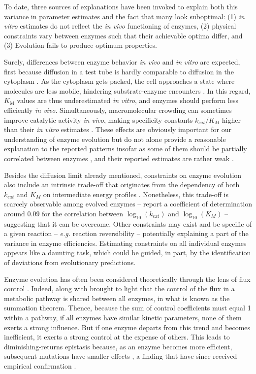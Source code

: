 \documentclass[11pt,onecolumn]{article}
\begin{document}
To date, three sources of explanations have been invoked to explain both this variance in parameter estimates and the fact that many look suboptimal: (1) \textit{in vitro} estimates do not reflect the \textit{in vivo} functioning of enzymes, (2) physical constraints vary between enzymes such that their achievable optima differ, and (3) Evolution fails to produce optimum properties.

Surely, differences between enzyme behavior \textit{in vivo} and \textit{in vitro} are expected, first because diffusion in a test tube is hardly comparable to diffusion in the cytoplasm \citep{Ellis01,Rivas04,Zhou08,Rivas18}. As the cytoplasm gets packed, the cell approaches a state where molecules are less mobile, hindering substrate-enzyme encounters \citep{Muramatsu88,Zimmerman93,Blanco18}. In this regard, $K_\text{M}$ values are thus underestimated \textit{in vitro}, and enzymes should perform less efficiently \textit{in vivo}. Simultaneously, macromolecular crowding can sometimes improve catalytic activity \textit{in vivo}, making specificity constants $k_{cat}/K_M$ higher than their \textit{in vitro} estimates \citep{Ralston90,Ellis01,Jiang07,Pozdnyakova10}. These effects are obviously important for our understanding of enzyme evolution but do not alone provide a reasonable explanation to the reported patterns insofar as some of them should be partially correlated between enzymes \citep{Tabaka14}, and their reported estimates are rather weak \cite{Davidi16}.

Besides the diffusion limit already mentioned, constraints on enzyme evolution also include an intrinsic trade-off that originates from the dependency of both $k_{cat}$ and $K_M$ on intermediate energy profiles
\citep{Heinrich91}. Nonetheless, this trade-off is scarcely observable among evolved enzymes -- \citet{Bar-Even11} report a coefficient of determination around $0.09$ for the correlation between $\log_{10}(k_\text{cat})$ and $\log_{10}(K_M)$ -- suggesting that it can be overcome. 
Other constraints may exist and be specific of a given reaction \citep{Klipp94} -- \textit{e.g.} reaction reversibility -- potentially explaining a part of the variance in enzyme efficiencies.
Estimating constraints on all individual enzymes appears like a daunting task, which could be guided, in part, by the identification of deviations from evolutionary predictions.

Enzyme evolution has often been considered theoretically through the lens of flux control \citep{Burns85,Fell92,Kacser95}. Indeed, \citep{Kacser73} along with \citep{Heinrich74} brought to light that the control of the flux in a metabolic pathway is shared between all enzymes, in what is known as the summation theorem. Thence, because the sum of control coefficients must equal 1 within a pathway, if all enzymes have similar kinetic parameters, none of them exerts a strong influence. But if one enzyme departs from this trend and becomes inefficient, it exerts a strong control at the expense of others. This leads to diminishing-returns epistasis because, as an enzyme becomes more efficient, subsequent mutations have smaller effects \citep{Kacser73,Dykhuizen87,Tokuriki12}, a finding that have since received empirical confirmation \citep{Fell92,Lunzer05}.
\end{document}
